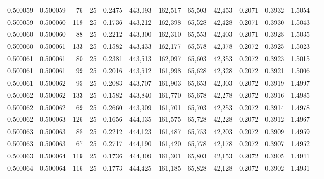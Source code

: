 \begin{tabular}{rrrrrrrrrrrrr}
0.500059 & 0.500059 &  76 &  25 &                                     0.2475 & 443,093 & 162,517 &  65,503 &  42,453 & 0.2071 & 0.3932 & 1.5054 \\
0.500059 & 0.500060 & 119 &  25 &                                     0.1736 & 443,212 & 162,398 &  65,528 &  42,428 & 0.2071 & 0.3930 & 1.5043 \\
0.500060 & 0.500060 &  88 &  25 &                                     0.2212 & 443,300 & 162,310 &  65,553 &  42,403 & 0.2071 & 0.3928 & 1.5035 \\
0.500060 & 0.500061 & 133 &  25 &                                     0.1582 & 443,433 & 162,177 &  65,578 &  42,378 & 0.2072 & 0.3925 & 1.5023 \\
0.500061 & 0.500061 &  80 &  25 &                                     0.2381 & 443,513 & 162,097 &  65,603 &  42,353 & 0.2072 & 0.3923 & 1.5015 \\
0.500061 & 0.500061 &  99 &  25 &                                     0.2016 & 443,612 & 161,998 &  65,628 &  42,328 & 0.2072 & 0.3921 & 1.5006 \\
0.500061 & 0.500062 &  95 &  25 &                                     0.2083 & 443,707 & 161,903 &  65,653 &  42,303 & 0.2072 & 0.3919 & 1.4997 \\
0.500062 & 0.500062 & 133 &  25 &                                     0.1582 & 443,840 & 161,770 &  65,678 &  42,278 & 0.2072 & 0.3916 & 1.4985 \\
0.500062 & 0.500062 &  69 &  25 &                                     0.2660 & 443,909 & 161,701 &  65,703 &  42,253 & 0.2072 & 0.3914 & 1.4978 \\
0.500062 & 0.500063 & 126 &  25 &                                     0.1656 & 444,035 & 161,575 &  65,728 &  42,228 & 0.2072 & 0.3912 & 1.4967 \\
0.500063 & 0.500063 &  88 &  25 &                                     0.2212 & 444,123 & 161,487 &  65,753 &  42,203 & 0.2072 & 0.3909 & 1.4959 \\
0.500063 & 0.500063 &  67 &  25 &                                     0.2717 & 444,190 & 161,420 &  65,778 &  42,178 & 0.2072 & 0.3907 & 1.4952 \\
0.500063 & 0.500064 & 119 &  25 &                                     0.1736 & 444,309 & 161,301 &  65,803 &  42,153 & 0.2072 & 0.3905 & 1.4941 \\
0.500064 & 0.500064 & 116 &  25 &                                     0.1773 & 444,425 & 161,185 &  65,828 &  42,128 & 0.2072 & 0.3902 & 1.4931 \\

\end{tabular}
